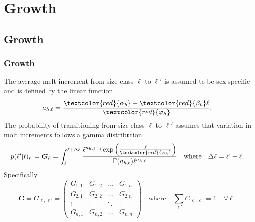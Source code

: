 \documentclass{beamer}
\begin{document}

\section{Growth}


\subsection{Growth}
\begin{frame}
\frametitle{Growth}
The average molt increment from size class $\ell$ to $\ell'$ is assumed to be
sex-specific and is defined by the linear function
\begin{equation*}
  a_{h,\ell} = \frac{\textcolor{red}{\alpha_h} + \textcolor{red}{\beta_h}
    \ell}{\textcolor{red}{\varphi_h}}.
\end{equation*}
The probability of transitioning from size class $\ell$ to $\ell'$ assumes that
variation in molt increments follows a gamma distribution
\begin{equation*}
  p (\ell'|\ell)_h = \boldsymbol{G}_h = \int^{\ell + \Delta \ell}_\ell \frac{\ell^{a_{h,\ell-1}} \exp
    \left(\frac{\ell}{\textcolor{red}{\varphi_h}} \right)}{\Gamma (a_{h,\ell}) \ell^{a_{h,\ell}}}
  \quad \text{where} \quad \Delta \ell = \ell' - \ell.
\end{equation*}
Specifically
\begin{equation*}
  \boldsymbol{G} = G_{\ell,\ell'} = \left( \begin{array}{cccc}
      G_{1,1} & G_{1,2} & \hdots & G_{1,n} \\
      G_{2,1} & G_{2,2} & \hdots & G_{2,n} \\
      \vdots & \vdots & \ddots & \vdots \\
      G_{n,1} & G_{n,2} & \hdots & G_{n,n} \end{array} \right)
  \quad \text{where} \quad \sum_{\ell'} G_{\ell,\ell'} = 1 \quad \forall \ell.
\end{equation*}
\end{frame}

\end{document}
